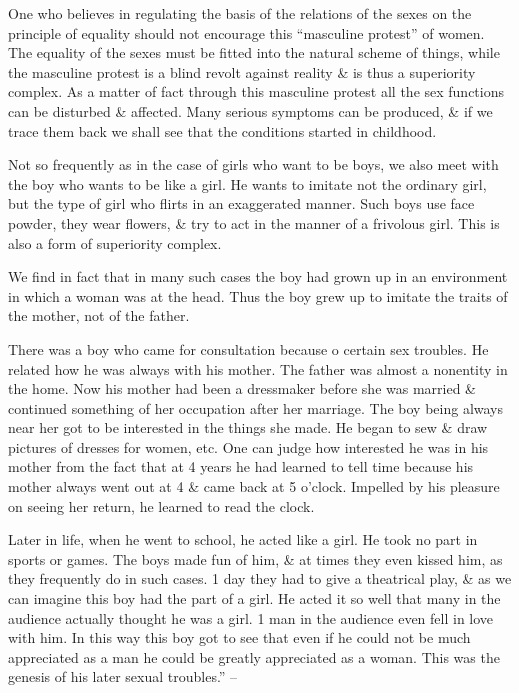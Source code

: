 \documentclass{article}
\begin{document}
One who believes in regulating the basis of the relations of the sexes on the principle of equality should not encourage this ``masculine protest'' of women. The equality of the sexes must be fitted into the natural scheme of things, while the masculine protest is a blind revolt against reality \& is thus a superiority complex. As a matter of fact through this masculine protest all the sex functions can be disturbed \& affected. Many serious symptoms can be produced, \& if we trace them back we shall see that the conditions started in childhood.

Not so frequently as in the case of girls who want to be boys, we also meet with the boy who wants to be like a girl. He wants to imitate not the ordinary girl, but the type of girl who flirts in an exaggerated manner. Such boys use face powder, they wear flowers, \& try to act in the manner of a frivolous girl. This is also a form of superiority complex.

We find in fact that in many such cases the boy had grown up in an environment in which a woman was at the head. Thus the boy grew up to imitate the traits of the mother, not of the father.

There was a boy who came for consultation because o certain sex troubles. He related how he was always with his mother. The father was almost a nonentity in the home. Now his mother had been a dressmaker before she was married \& continued something of her occupation after her marriage. The boy being always near her got to be interested in the things she made. He began to sew \& draw pictures of dresses for women, etc. One can judge how interested he was in his mother from the fact  that at 4 years he had learned to tell time because his mother always went out at 4 \& came back at 5 o'clock. Impelled by his pleasure on seeing her return, he learned to read the clock.

Later in life, when he went to school, he acted like a girl. He took no part in sports or games. The boys made fun of him, \& at times they even kissed him, as they frequently do in such cases. 1 day they had to give a theatrical play, \& as we can imagine this boy had the part of a girl. He acted it so well that many in the audience actually thought he was a girl. 1 man in the audience even fell in love with him. In this way this boy got to see that even if he could not be much appreciated as a man he could be greatly appreciated as a woman. This was the genesis of his later sexual troubles.'' -- \cite[pp. 135--153]{Adler_science_living}
\end{document}
